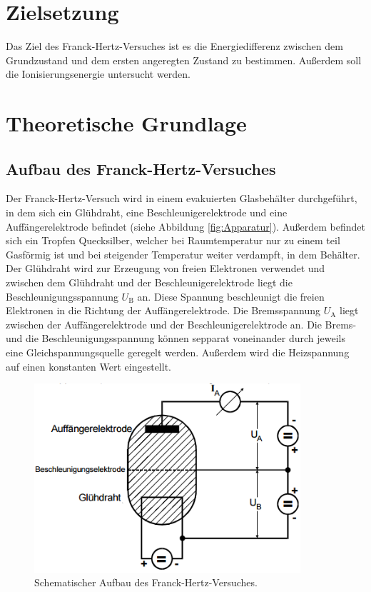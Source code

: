 \section{Zielsetzung}
Das Ziel des Franck-Hertz-Versuches ist es die Energiedifferenz zwischen dem Grundzustand und dem ersten angeregten Zustand zu bestimmen. Außerdem soll die Ionisierungsenergie untersucht werden.

\section{Theoretische Grundlage}
\label{sec:Theorie}
\subsection{Aufbau des Franck-Hertz-Versuches}
Der Franck-Hertz-Versuch wird in einem evakuierten Glasbehälter durchgeführt, in dem sich ein Glühdraht, eine Beschleunigerelektrode und eine Auffängerelektrode befindet (siehe Abbildung \eqref{fig:Apparatur}). Außerdem befindet sich ein Tropfen Quecksilber, welcher bei Raumtemperatur nur zu einem teil Gasförmig ist und bei steigender Temperatur weiter verdampft, in dem Behälter. Der Glühdraht wird zur Erzeugung von freien Elektronen verwendet und zwischen dem Glühdraht und der Beschleunigerelektrode liegt die Beschleunigungsspannung $U_\text{B}$ an. Diese Spannung beschleunigt die freien Elektronen in die Richtung der Auffängerelektrode. Die Bremsspannung $U_\text{A}$ liegt zwischen der Auffängerelektrode und der Beschleunigerelektrode an. Die Brems- und die Beschleunigungsspannung können sepparat voneinander durch jeweils eine Gleichspannungsquelle geregelt werden. Außerdem wird die Heizspannung auf einen konstanten Wert eingestellt.

\begin{figure}[H]
  \centering
  \includegraphics[height=7cm]{picture/Franck-Hertz-Apparatur}
  \caption{Schematischer Aufbau des Franck-Hertz-Versuches. \cite[2]{sample}}
  \label{fig:Apparatur}
\end{figure}

